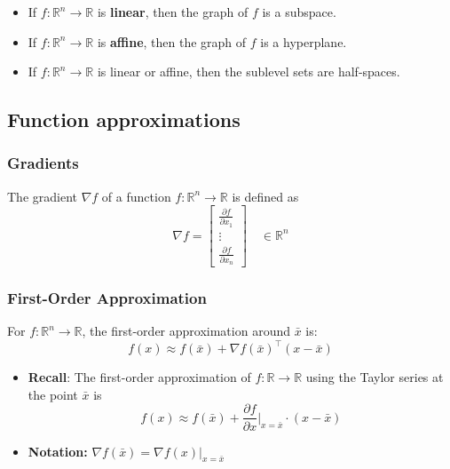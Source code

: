     \begin{definition}
        \begin{itemize}
            \item If $f: \mathbb{R}^n \to \mathbb{R}$ is \textbf{linear}, then the graph of $f$ is a subspace.
            \item If $f: \mathbb{R}^n \to \mathbb{R}$ is \textbf{affine}, then the graph of $f$ is a hyperplane.
            \item If $f: \mathbb{R}^n \to \mathbb{R}$ is linear or affine, then the sublevel sets are half-spaces.
        \end{itemize}
    \end{definition}

\subsection{Function approximations}
    
    \subsubsection{Gradients}
    \begin{definition}
        The gradient $\nabla f$ of a function $f: \mathbb{R}^n \to \mathbb{R}$ is defined as
        \begin{equation}
            \nabla f = 
            \begin{bmatrix}
                \frac{\partial f}{\partial x_1} \\
                \vdots \\
                \frac{\partial f}{\partial x_n}
            \end{bmatrix}
            \quad \in \mathbb{R}^n
        \end{equation}
    \end{definition}

    \subsubsection{First-Order Approximation}
    \begin{definition}
        For $f: \mathbb{R}^n \to \mathbb{R}$, the first-order approximation around $\bar{x}$ is:
        \begin{equation}
            f(x) \approx f(\bar{x}) + \nabla f(\bar{x})^\top (x - \bar{x})
        \end{equation}

        \begin{itemize}
            \item \textbf{Recall}: The first-order approximation of $f: \mathbb{R} \to \mathbb{R}$ using the Taylor series at the point $\bar{x}$ is
            \[
            f(x) \approx f(\bar{x}) + \frac{\partial f}{\partial x} \bigg|_{x = \bar{x}} \cdot (x - \bar{x})
            \]
            \item \textbf{Notation:} $\nabla f(\bar{x}) = \nabla f(x) \bigg|_{x = \bar{x}}$
        \end{itemize}
    \end{definition}

